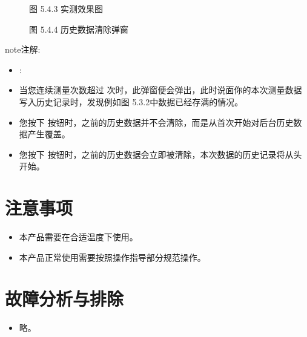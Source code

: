 \documentclass[a4paper,10pt,english]{sphinxmanual}
\begin{document}
\begin{figure}[htbp]
\centering
\capstart

\noindent{}
\caption{图 5.4.3 实测效果图}\label{\detokenize{operation_guide:id20}}\end{figure}

\begin{figure}[htbp]
\centering
\capstart

\noindent{}
\caption{图 5.4.4 历史数据清除弹窗}\label{\detokenize{operation_guide:id21}}\end{figure}

\begin{sphinxadmonition}{note}{注解:}\begin{itemize}
\item {} 
\sphinxAtStartPar
{} :

\item {} 
\sphinxAtStartPar
当您连续测量次数超过  次时，此弹窗便会弹出，此时说面你的本次测量数据写入历史记录时，发现例如图 5.3.2中数据已经存满的情况。

\item {} 
\sphinxAtStartPar
您按下  按钮时，之前的历史数据并不会清除，而是从首次开始对后台历史数据产生覆盖。

\item {} 
\sphinxAtStartPar
您按下  按钮时，之前的历史数据会立即被清除，本次数据的历史记录将从头开始。

\end{itemize}
\end{sphinxadmonition}


\section{注意事项}
\label{\detokenize{note:id1}}\label{\detokenize{note::doc}}\begin{itemize}
\item {} 
\sphinxAtStartPar
本产品需要在合适温度下使用。

\item {} 
\sphinxAtStartPar
本产品正常使用需要按照操作指导部分规范操作。

\end{itemize}


\section{故障分析与排除}
\label{\detokenize{fault:id1}}\label{\detokenize{fault::doc}}\begin{itemize}
\item {} 
\sphinxAtStartPar
略。

\end{itemize}
\end{document}

